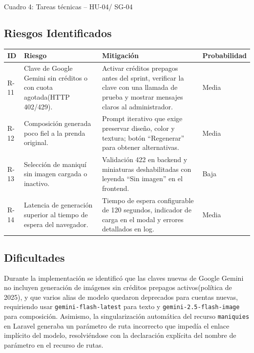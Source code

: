 \documentclass[12pt,a4paper]{article}
\begin{document}
\begin{center}
\small Cuadro 4: Tareas técnicas -- HU-04/ SG-04
\end{center}

\subsection*{Riesgos Identificados}

\begin{center}
\small
\begin{tabularx}{\textwidth}{p{1.2cm} p{4.6cm} L p{2cm}}
\toprule
\textbf{ID} & \textbf{Riesgo} & \textbf{Mitigación} & \textbf{Probabilidad} \\
\midrule
R-11 & Clave de Google Gemini sin créditos o con cuota agotada(HTTP 402/429). & Activar créditos prepagos antes del sprint, verificar la clave con una llamada de prueba y mostrar mensajes claros al administrador. & Media \\
R-12 & Composición generada poco fiel a la prenda original. & Prompt iterativo que exige preservar diseño, color y textura; botón ``Regenerar'' para obtener alternativas. & Media \\
R-13 & Selección de maniquí sin imagen cargada o inactivo. & Validación 422 en backend y miniaturas deshabilitadas con leyenda ``Sin imagen'' en el frontend. & Baja \\
R-14 & Latencia de generación superior al tiempo de espera del navegador. & Tiempo de espera configurable de 120 segundos, indicador de carga en el modal y errores detallados en log. & Media \\
\bottomrule
\end{tabularx}
\end{center}

\subsection*{Dificultades}

Durante la implementación se identificó que las claves nuevas de Google Gemini no incluyen generación de imágenes sin créditos prepagos activos(política de 2025), y que varios alias de modelo quedaron deprecados para cuentas nuevas, requiriendo usar \texttt{gemini-flash-latest} para texto y \texttt{gemini-2.5-flash-image} para composición. Asimismo, la singularización automática del recurso \texttt{maniquies} en Laravel generaba un parámetro de ruta incorrecto que impedía el enlace implícito del modelo, resolviéndose con la declaración explícita del nombre de parámetro en el recurso de rutas.
\end{document}
